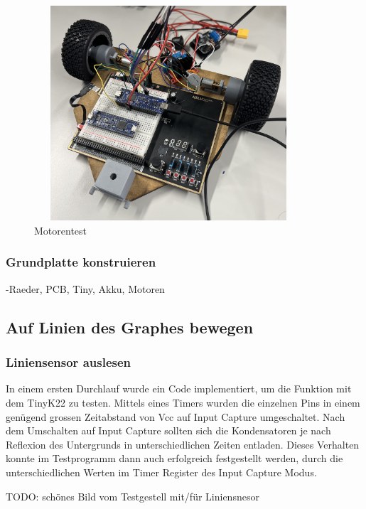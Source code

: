 \begin{figure}[H]
\centering
\includegraphics[width=10cm, height=8cm]{assets/ET/Motoren/Motorentest.jpeg}
\caption{Motorentest}
\label{fig: Motorentest}
\end{figure}

\subsubsection{Grundplatte konstruieren}

-Raeder, PCB, Tiny, Akku, Motoren


\newpage

\subsection{Auf Linien des Graphes bewegen}

\subsubsection{Liniensensor auslesen}

In einem ersten Durchlauf wurde ein Code implementiert, um die Funktion mit dem TinyK22 zu testen. Mittels eines Timers wurden die einzelnen Pins in einem genügend grossen Zeitabstand von Vcc auf Input Capture umgeschaltet. Nach dem Umschalten auf Input Capture sollten sich die Kondensatoren je nach Reflexion des Untergrunds in unterschiedlichen Zeiten entladen. Dieses Verhalten konnte im Testprogramm dann auch erfolgreich festgestellt werden, durch die unterschiedlichen Werten im Timer Register des Input Capture Modus.


TODO: schönes Bild vom Testgestell mit/für Liniensnesor

